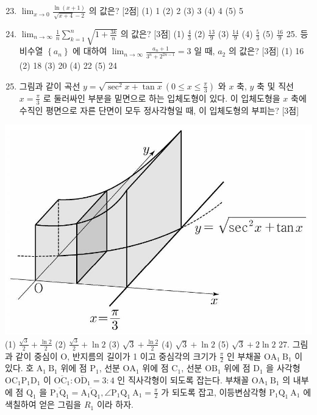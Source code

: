 \documentclass[10pt]{article}
\begin{document}
\begin{enumerate}
  \setcounter{enumi}{22}
  \item $\lim _{x \rightarrow 0} \frac{\ln (x+1)}{\sqrt{x+4}-2}$ 의 값은? [2점]
(1) 1
(2) 2
(3) 3
(4) 4
(5) 5

  \item $\lim _{n \rightarrow \infty} \frac{1}{n} \sum_{k=1}^{n} \sqrt{1+\frac{3 k}{n}}$ 의 값은? [3점]
(1) $\frac{4}{3}$
(2) $\frac{13}{9}$
(3) $\frac{14}{9}$
(4) $\frac{5}{3}$
(5) $\frac{16}{9}$ 25. 등비수열 $\left\{a_{n}\right\}$ 에 대하여 $\lim _{n \rightarrow \infty} \frac{a_{n}+1}{3^{n}+2^{2 n-1}}=3$ 일 때, $a_{2}$ 의 값은? [3점]
(1) 16
(2) 18
(3) 20
(4) 22
(5) 24

  \item 그림과 같이 곡선 $y=\sqrt{\sec ^{2} x+\tan x}\left(0 \leq x \leq \frac{\pi}{3}\right)$ 와 $x$ 축, $y$ 축 및 직선 $x=\frac{\pi}{3}$ 로 둘러싸인 부분을 밑면으로 하는 입체도형이 있다. 이 입체도형을 $x$ 축에 수직인 평면으로 자른 단면이 모두 정사각형일 때, 이 입체도형의 부피는? [3점]

\end{enumerate}

\includegraphics[max width=\textwidth, center]{2023_06_06_b380aa8523ec7afae994g-34}
(1) $\frac{\sqrt{3}}{2}+\frac{\ln 2}{2}$
(2) $\frac{\sqrt{3}}{2}+\ln 2$
(3) $\sqrt{3}+\frac{\ln 2}{2}$
(4) $\sqrt{3}+\ln 2$
(5) $\sqrt{3}+2 \ln 2$ 27. 그림과 같이 중심이 $\mathrm{O}$, 반지름의 길이가 1 이고 중심각의 크기가 $\frac{\pi}{2}$ 인 부채꼴 $\mathrm{OA}_{1} \mathrm{~B}_{1}$ 이 있다. 호 $\mathrm{A}_{1} \mathrm{~B}_{1}$ 위에 점 $\mathrm{P}_{1}$, 선분 $\mathrm{OA}_{1}$ 위에 점 $\mathrm{C}_{1}$, 선분 $\mathrm{OB}_{1}$ 위에 점 $\mathrm{D}_{1}$ 을 사각형 $\mathrm{OC}_{1} \mathrm{P}_{1} \mathrm{D}_{1}$ 이 $\overline{\mathrm{OC}_{1}}: \overline{\mathrm{OD}_{1}}=3: 4$ 인 직사각형이 되도록 잡는다. 부채꼴 $\mathrm{OA}_{1} \mathrm{~B}_{1}$ 의 내부에 점 $\mathrm{Q}_{1}$ 을 $\overline{\mathrm{P}_{1} \mathrm{Q}_{1}}=\overline{\mathrm{A}_{1} \mathrm{Q}_{1}}, \angle \mathrm{P}_{1} \mathrm{Q}_{1} \mathrm{~A}_{1}=\frac{\pi}{2}$ 가 되도록 잡고, 이등변삼각형 $\mathrm{P}_{1} \mathrm{Q}_{1} \mathrm{~A}_{1}$ 에 색칠하여 얻은 그림을 $R_{1}$ 이라 하자.
\end{document}
